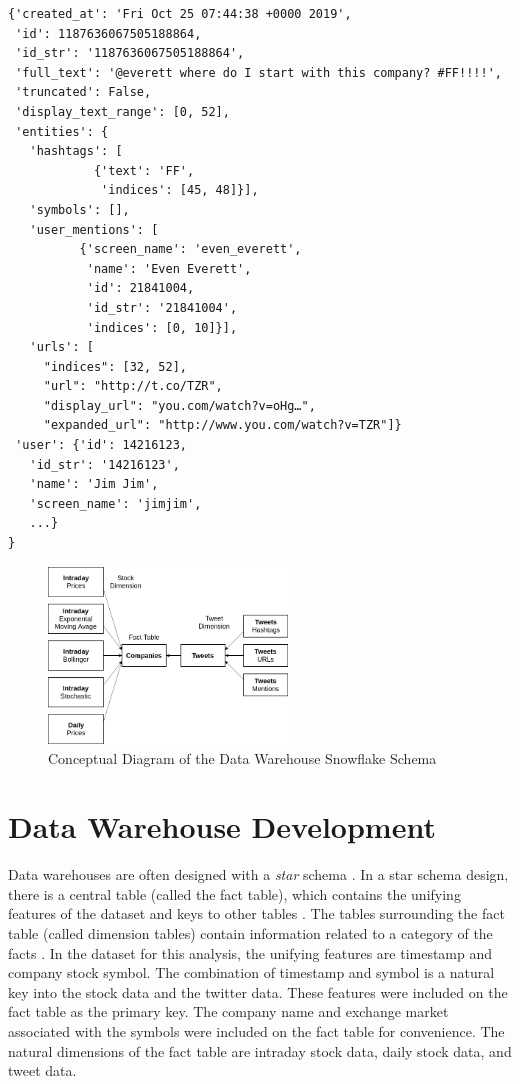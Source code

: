 \documentclass[journal]{IEEEtran}
\begin{document}

\begin{lstlisting}[frame=single,
 caption={Sample Tweet JSON},
 label={SampleTweet}]
{'created_at': 'Fri Oct 25 07:44:38 +0000 2019',
 'id': 1187636067505188864,
 'id_str': '1187636067505188864',
 'full_text': '@everett where do I start with this company? #FF!!!!',
 'truncated': False,
 'display_text_range': [0, 52],
 'entities': {
   'hashtags': [
            {'text': 'FF',
             'indices': [45, 48]}],
   'symbols': [],
   'user_mentions': [
          {'screen_name': 'even_everett',
           'name': 'Even Everett',
           'id': 21841004,
           'id_str': '21841004',
           'indices': [0, 10]}],
   'urls': [
     "indices": [32, 52],
     "url": "http://t.co/TZR",
     "display_url": "you.com/watch?v=oHg…",
     "expanded_url": "http://www.you.com/watch?v=TZR"]}
 'user': {'id': 14216123,
   'id_str': '14216123',
   'name': 'Jim Jim',
   'screen_name': 'jimjim',
   ...}
}
\end{lstlisting}

\begin{figure}
	\centering
	\includegraphics[width=2.5in]{SnowFlake_Schema_Simple.png}
	\caption{Conceptual Diagram of the Data Warehouse Snowflake Schema}
	\label{snowflake}
\end{figure}

\section{Data Warehouse Development}
\label{DataWarehouseDevelopment}

Data warehouses are often designed with a \textit{star} schema 
 \cite{BuildingtheDWCH11}.
In a star schema design, there is a central table (called the fact table),
 which contains the unifying features of the dataset and keys to other tables
 \cite{BuildingtheDWCH11}.
The tables surrounding the fact table (called dimension tables) 
 contain information related to a category of the facts \cite{Enterprise}.
In the dataset for this analysis, the unifying features are timestamp and
 company stock symbol.
The combination of timestamp and symbol is a natural key into the stock data and
 the twitter data.
These features were included on the fact table as the primary key.
The company name and exchange market associated with the symbols were 
 included on the fact table for convenience.
The natural dimensions of the fact table are intraday stock data,
 daily stock data, and tweet data.
\end{document}
